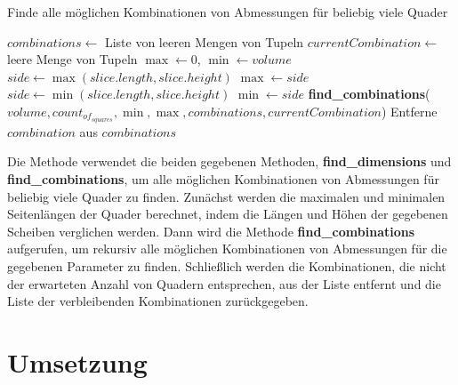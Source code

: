 \documentclass[a4paper,10pt,ngerman]{scrartcl}
\begin{document}
    \begin{algorithm}[H]
        \caption{Finde alle möglichen Kombinationen von Abmessungen für beliebig viele Quader}
        \label{alg:p}
            \State $combinations \gets$ Liste von leeren Mengen von Tupeln
            \State $currentCombination \gets$ leere Menge von Tupeln
            \State $\max \gets 0$, $\min \gets volume$
                \State $side \gets \max(slice.length, slice.height)$
                    \State $\max \gets side$
                \EndIf
                \State $side \gets \min(slice.length, slice.height)$
                    \State $\min \gets side$
                \EndIf
            \EndFor
            \State \textbf{find\_combinations}($volume, count_{of}_{squares}, \min, \max, combinations, currentCombination$)
                    \State Entferne $combination$ aus $combinations$
                \EndIf
            \EndFor
            \State {}\label{alg:algorithm}
        \EndFunction
    \end{algorithm}

    Die Methode verwendet die beiden gegebenen Methoden, \textbf{find\_dimensions} und \textbf{find\_combinations}, um alle möglichen Kombinationen von Abmessungen für beliebig viele Quader zu finden.
    Zunächst werden die maximalen und minimalen Seitenlängen der Quader berechnet, indem die Längen und Höhen der gegebenen Scheiben verglichen werden.
    Dann wird die Methode \textbf{find\_combinations} aufgerufen, um rekursiv alle möglichen Kombinationen von Abmessungen für die gegebenen Parameter zu finden.
    Schließlich werden die Kombinationen, die nicht der erwarteten Anzahl von Quadern entsprechen, aus der Liste entfernt und die Liste der verbleibenden Kombinationen zurückgegeben.


    \newpage


    \section{Umsetzung}\label{sec:umsetzung}
\end{document}
